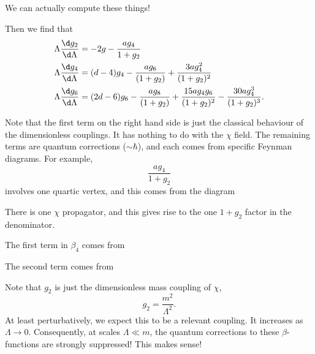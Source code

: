 \documentclass[a4paper]{article}
\begin{document}
We can actually compute these things!
\begin{eg}
  Then we find that
  \begin{align*}
    \Lambda \frac{\d g_2}{\d \Lambda} &= - 2g - \frac{a g_4}{1 + g_2}\\
    \Lambda \frac{\d g_4}{\d \Lambda} &= (d - 4) g_4 - \frac{ag_6}{(1 + g_2)} + \frac{3a g_4^2}{(1 + g_2)^2}\\
    \Lambda \frac{\d g_6}{\d \Lambda} &= (2d - 6) g_6 - \frac{a g_8}{(1 + g_2)} + \frac{15 a g_4 g_6}{(1 + g_2)^2} - \frac{30 a g_4^3}{(1 + g_2)^3}.
  \end{align*}
\end{eg}
Note that the first term on the right hand side is just the classical behaviour of the dimensionless couplings. It has nothing to do with the $\chi$ field. The remaining terms are quantum corrections ($\sim \hbar$), and each comes from specific Feynman diagrams. For example,
\[
  \frac{a g_4}{1 + g_2}
\]
involves one quartic vertex, and this comes from the diagram
\begin{center}
\end{center}
There is one $\chi$ propagator, and this gives rise to the one $1 + g_2$ factor in the denominator.

The first term in $\beta_4$ comes from
\begin{center}
\end{center}
The second term comes from
\begin{center}
\end{center}
Note that $g_2$ is just the dimensionless mass coupling of $\chi$,
\[
  g_2 = \frac{m^2}{\Lambda^2}.
\]
At least perturbatively, we expect this to be a relevant coupling. It increases as $\Lambda \to 0$. Consequently, at scales $\Lambda \ll m$, the quantum corrections to these $\beta$-functions are strongly suppressed! This makes sense!
\end{document}
